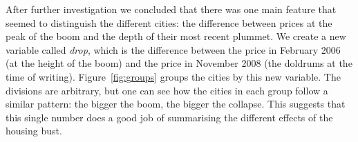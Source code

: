 \documentclass[oneside]{article}
\begin{document}
% 
% 

After further investigation we concluded that there was one main feature that seemed to distinguish the different cities: the difference between prices at the peak of the boom and the depth of their most recent plummet.  We create a new variable called {\em drop}, which is the difference between the price in February 2006 (at the height of the boom) and the price in November 2008 (the doldrums at the time of writing). Figure~\ref{fig:groups} groups the cities by this new variable.  The divisions are arbitrary, but one can see how the cities in each group follow a similar pattern: the bigger the boom, the bigger the collapse.  This suggests that this single number does a good job of summarising the different effects of the housing bust.
\end{document}

